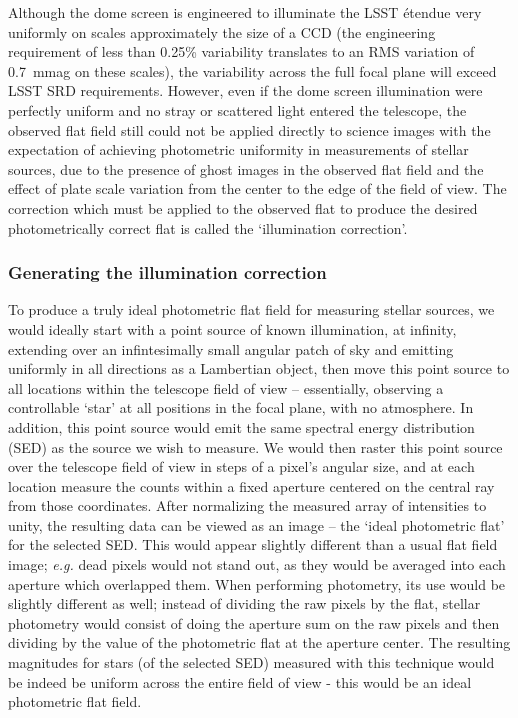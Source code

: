 \documentclass[12pt,preprint]{aastex}
\begin{document}
Although the dome screen is engineered to illuminate the LSST \'{e}tendue
very uniformly on scales approximately the size of a CCD (the
engineering requirement of less than 0.25\% variability translates to
an RMS variation of 0.7~mmag on these scales), the variability across
the full focal plane will exceed LSST SRD requirements. However, even
if the dome screen illumination were perfectly uniform and no stray or
scattered light entered the telescope, the observed flat field still
could not be applied directly to science images with the expectation
of achieving photometric uniformity in measurements of stellar
sources, due to the presence of ghost images in the observed flat field
and the effect of plate scale variation from the center to the edge of
the field of view.  The correction which must be applied to the
observed flat to produce the desired photometrically correct flat is
called the `illumination correction'.


\subsubsection{Generating the illumination correction}
\label{sec:ic}

To produce a truly ideal photometric flat field for measuring stellar
sources, we would ideally start with a point source of known
illumination, at infinity, extending over an infintesimally small
angular patch of sky and emitting uniformly in all directions as a
Lambertian object, then move this point source to all locations within
the telescope field of view -- essentially, observing a controllable
`star' at all positions in the focal plane, with no atmosphere. In
addition, this point source would emit the same spectral energy
distribution (SED) as the source we wish to measure. We would then
raster this point source over the telescope field of view in steps of
a pixel's angular size, and at each location measure the counts within
a fixed aperture centered on the central ray from those coordinates.
After normalizing the measured array of intensities to unity, the
resulting data can be viewed as an image -- the `ideal photometric
flat' for the selected SED.  This would appear slightly different than
a usual flat field image; {\it e.g.} dead pixels would not stand out,
as they would be averaged into each aperture which overlapped
them. When performing photometry, its use would be slightly different
as well; instead of dividing the raw pixels by the flat, stellar
photometry would consist of doing the aperture sum on the raw pixels
and then dividing by the value of the photometric flat at the aperture
center.  The resulting magnitudes for stars (of the selected SED)
measured with this technique would be indeed be uniform across the
entire field of view - this would be an ideal photometric flat field.
\end{document}
